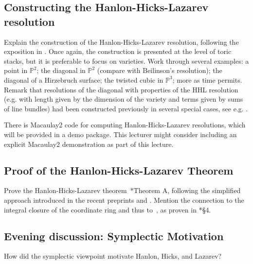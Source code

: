 \documentclass[11pt]{amsart}
\numberwithin{equation}{section}
\theoremstyle{definition}
\theoremstyle{remark}
\newcommand{\PP}{\mathbb P}
\begin{document}

\subsection{Constructing the Hanlon-Hicks-Lazarev resolution} Explain the construction of the Hanlon-Hicks-Lazarev resolution, following the exposition in \cite{BH25}. Once again, the construction is presented at the level of toric stacks, but it is preferable to focus on varieties. Work through several examples: a point in $\PP^2$; the diagonal in $\PP^2$ (compare with Beilinson's resolution); the diagonal of a Hirzebruch surface; the twisted cubic in $\PP^3$; more as time permits. Remark that resolutions of the diagonal with properties of the HHL resolution (e.g. with length given by the dimension of the variety and terms given by sums of line bundles) had been constructed previously in several special cases, see e.g. \cite{BE24b, BPS01, BS24, CK08}. 

There is Macaulay2 code for computing Hanlon-Hicks-Lazarev resolutions, which will be provided in a demo package.  This lecturer might consider including an explicit Macaulay2 demonstration as part of this lecture.

\subsection{Proof of the Hanlon-Hicks-Lazarev Theorem} Prove the Hanlon-Hicks-Lazarev theorem~\cite{HHL24}*{Theorem A}, following the simplified approach introduced in the recent preprints \cite{BCS+25} and \cite{BH25}.  Mention the connection to the integral closure of the coordinate ring and thus to~\cite{BE24a}, as proven in \cite{BCS+25}*{\S4}.


\subsection*{Evening discussion: Symplectic Motivation}
How did the symplectic viewpoint motivate Hanlon, Hicks, and Lazarev?
\end{document}
